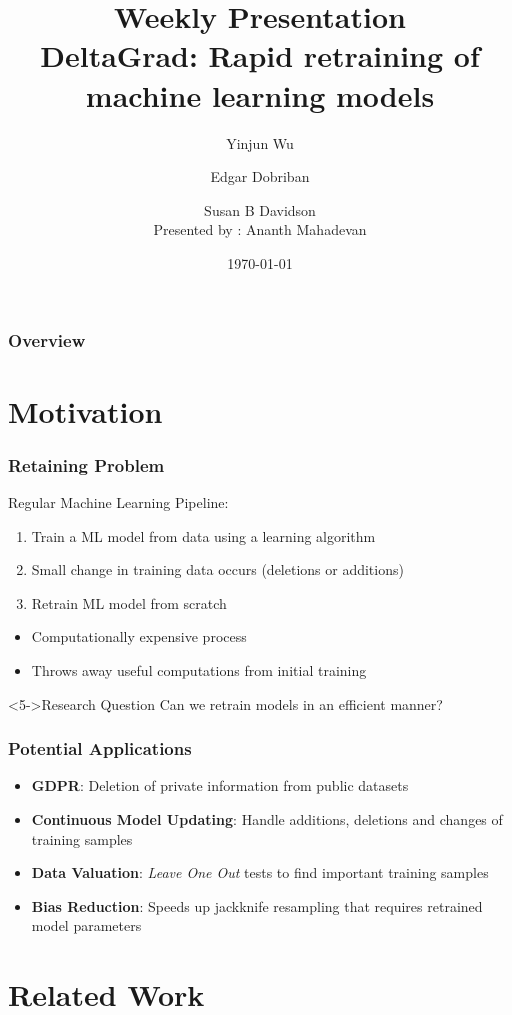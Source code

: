 \documentclass[pdf]{beamer}
\title[DeltaGrad]{Weekly Presentation\\DeltaGrad: Rapid retraining of machine learning models}
\author[Wu et al.~]{Yinjun Wu \and Edgar Dobriban \and Susan B Davidson\\ Presented by : Ananth Mahadevan}
\date{\today}
\begin{document}
\begin{frame}
    \titlepage
\end{frame}

\begin{frame}
    \frametitle{Overview}
    \tableofcontents
\end{frame}


\section{Motivation}
\begin{frame}
    \frametitle{Retaining Problem}
    Regular Machine Learning Pipeline:
    \begin{enumerate}
      \item Train a ML model from data using a learning algorithm
      \item Small change in training data occurs (deletions or additions)
      \item Retrain ML model from scratch
    \end{enumerate}
    \begin{itemize}
      \item<3-> Computationally expensive process
      \item<4-> Throws away useful computations from initial training
    \end{itemize}
    \begin{block}<5->{Research Question}
      Can we retrain models in an efficient manner?
    \end{block}
\end{frame}

\begin{frame}
  \frametitle{Potential Applications}
  \begin{itemize}
    \item<1-> \textbf{GDPR}: Deletion of private information from public datasets
    \item<2-> \textbf{Continuous Model Updating}: Handle additions, deletions and changes of training samples
    \item<3-> \textbf{Data Valuation}: \textit{Leave One Out} tests to find important training samples 
    \item<4-> \textbf{Bias Reduction}: Speeds up jackknife resampling that requires retrained model parameters 
  \end{itemize}
  

\end{frame}
\section{Related Work}
\end{document}
